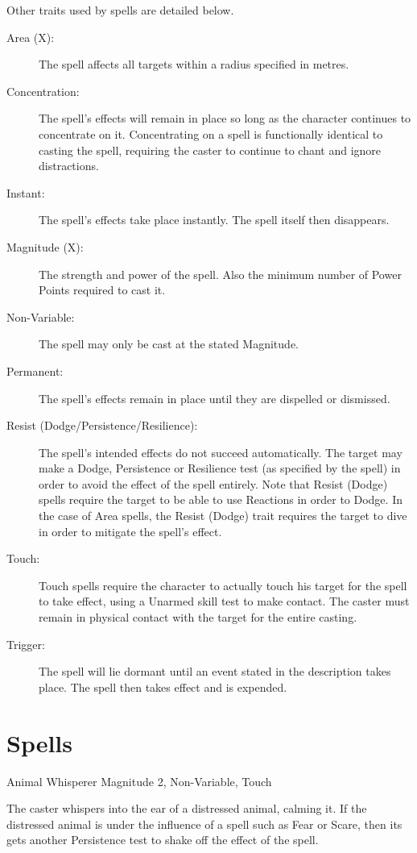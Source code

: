 Other traits used by spells are detailed below. 
\begin{description}
	\item[Area (X):] The spell affects all targets within a radius specified in metres. 
	\item[Concentration:] The spell’s effects will remain in place so long as the character continues to concentrate on it. Concentrating on a spell is functionally identical to casting the spell, requiring the caster to continue to chant and ignore distractions. 
	\item[Instant:] The spell’s effects take place instantly. The spell itself then disappears. 
	\item[Magnitude (X):] The strength and power of the spell. Also the minimum number of Power Points required to cast it. 
	\item[Non-Variable:] The spell may only be cast at the stated Magnitude.
	\item[Permanent:] The spell’s effects remain in place until they are dispelled or dismissed. 
	\item[Resist (Dodge/Persistence/Resilience):] The spell’s intended effects do not succeed automatically. The target may make a Dodge, Persistence or Resilience test (as specified by the spell) in order to avoid the effect of the spell entirely. Note that Resist (Dodge) spells require the target to be able to use Reactions in order to Dodge. In the case of Area spells, the Resist (Dodge) trait requires the target to dive in order to mitigate the spell’s effect. 
	\item[Touch:] Touch spells require the character to actually touch his target for the spell to take effect, using a Unarmed skill test to make contact. The caster must remain in physical contact with the target for the entire casting.
	\item[Trigger:] The spell will lie dormant until an event stated in the description takes place. The spell then takes effect and is expended.
\end{description}

\section{Spells}

\begin{rpg-spell}
{Animal Whisperer}
{Magnitude 2, Non-Variable, Touch}

The caster whispers into the ear of a distressed animal, calming it. If the distressed animal is under the influence of a spell such as Fear or Scare, then its gets another Persistence test to shake off the effect of the spell.
\end{rpg-spell}


